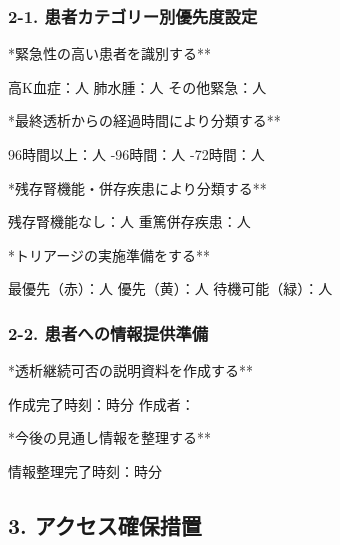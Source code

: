 \documentclass[
  japanese,
  letterpaper,
  DIV=11,
  numbers=noendperiod]{scrartcl}
\begin{document}
\subsubsection{2-1.
患者カテゴリー別優先度設定}\label{ux60a3ux8005ux30abux30c6ux30b4ux30eaux30fcux5225ux512aux5148ux5ea6ux8a2dux5b9a}

\checkbox **緊急性の高い患者を識別する**

\quad 高K血症：\underlinespace{2cm}人
\quad 肺水腫：\underlinespace{2cm}人
\quad その他緊急：\underlinespace{2cm}人

\vspace{3mm}

\checkbox **最終透析からの経過時間により分類する**

\quad 96時間以上：\underlinespace{2cm}人
-96時間：\underlinespace{2cm}人
-72時間：\underlinespace{2cm}人

\vspace{3mm}

\checkbox **残存腎機能・併存疾患により分類する**

\quad 残存腎機能なし：\underlinespace{2cm}人
\quad 重篤併存疾患：\underlinespace{2cm}人

\vspace{3mm}

\checkbox **トリアージの実施準備をする**

\quad 最優先（赤）：\underlinespace{2cm}人
\quad 優先（黄）：\underlinespace{2cm}人
\quad 待機可能（緑）：\underlinespace{2cm}人

\vspace{5mm}

\subsubsection{2-2.
患者への情報提供準備}\label{ux60a3ux8005ux3078ux306eux60c5ux5831ux63d0ux4f9bux6e96ux5099}

\checkbox **透析継続可否の説明資料を作成する**

\quad 作成完了時刻：\underlinespace{1cm}時\underlinespace{1cm}分
\quad 作成者：\underlinespace{4cm}

\vspace{3mm}

\checkbox **今後の見通し情報を整理する**

\quad 情報整理完了時刻：\underlinespace{1cm}時\underlinespace{1cm}分

\vspace{5mm}

\subsection{3.
アクセス確保措置}\label{ux30a2ux30afux30bbux30b9ux78baux4fddux63aaux7f6e}
\end{document}
